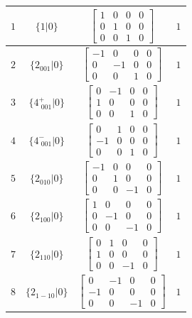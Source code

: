 \documentclass[fleqn,8pt]{jsarticle}
\begin{document}
\begin{longtable}{cccc}
$ 1 $ & $ \{1|0\} $ & $ \begin{bmatrix} 1 & 0 & 0 & 0 \\ 0 & 1 & 0 & 0 \\ 0 & 0 & 1 & 0 \end{bmatrix} $ & $ 1 $ \\ \hline
$ 2 $ & $ \{2{}_{001}|0\} $ & $ \begin{bmatrix} -1 & 0 & 0 & 0 \\ 0 & -1 & 0 & 0 \\ 0 & 0 & 1 & 0 \end{bmatrix} $ & $ 1 $ \\ \hline
$ 3 $ & $ \{4^{+}_{\,\,001}|0\} $ & $ \begin{bmatrix} 0 & -1 & 0 & 0 \\ 1 & 0 & 0 & 0 \\ 0 & 0 & 1 & 0 \end{bmatrix} $ & $ 1 $ \\ \hline
$ 4 $ & $ \{4^{-}_{\,\,001}|0\} $ & $ \begin{bmatrix} 0 & 1 & 0 & 0 \\ -1 & 0 & 0 & 0 \\ 0 & 0 & 1 & 0 \end{bmatrix} $ & $ 1 $ \\ \hline
$ 5 $ & $ \{2{}_{010}|0\} $ & $ \begin{bmatrix} -1 & 0 & 0 & 0 \\ 0 & 1 & 0 & 0 \\ 0 & 0 & -1 & 0 \end{bmatrix} $ & $ 1 $ \\ \hline
$ 6 $ & $ \{2{}_{100}|0\} $ & $ \begin{bmatrix} 1 & 0 & 0 & 0 \\ 0 & -1 & 0 & 0 \\ 0 & 0 & -1 & 0 \end{bmatrix} $ & $ 1 $ \\ \hline
$ 7 $ & $ \{2{}_{110}|0\} $ & $ \begin{bmatrix} 0 & 1 & 0 & 0 \\ 1 & 0 & 0 & 0 \\ 0 & 0 & -1 & 0 \end{bmatrix} $ & $ 1 $ \\ \hline
$ 8 $ & $ \{2{}_{1-10}|0\} $ & $ \begin{bmatrix} 0 & -1 & 0 & 0 \\ -1 & 0 & 0 & 0 \\ 0 & 0 & -1 & 0 \end{bmatrix} $ & $ 1 $ \\
\end{longtable}
\end{document}
